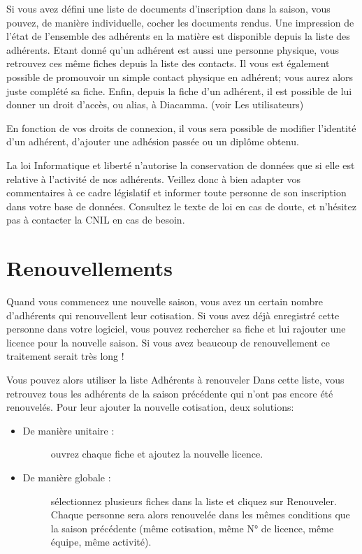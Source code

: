 \documentclass[a4paper,10pt,oneside,french]{sphinxmanual}
\begin{document}
Si vous avez défini une liste de documents d’inscription dans la saison, vous pouvez, de manière individuelle, cocher les documents rendus. Une impression de l’état de l’ensemble des adhérents en la matière est disponible depuis la liste des adhérents.
Etant donné qu’un adhérent est aussi une personne physique, vous retrouvez ces même fiches depuis la liste des contacts. Il vous est également possible de promouvoir un simple contact physique en adhérent; vous aurez alors juste complété sa fiche.
Enfin, depuis la fiche d’un adhérent, il est possible de lui donner un droit d’accès, ou alias, à Diacamma. (voir Les utilisateurs)

En fonction de vos droits de connexion, il vous sera possible de modifier l’identité d’un adhérent, d’ajouter une adhésion passée ou un diplôme obtenu.

\noindent{}

 La loi Informatique et liberté n’autorise la conservation de données que si elle est relative à l’activité de nos adhérents. Veillez donc à bien adapter vos commentaires à ce cadre législatif et informer toute personne de son inscription dans votre base de données.
Consultez le texte de loi en cas de doute, et n’hésitez pas à contacter la CNIL en cas de besoin.


\section{Renouvellements}
\label{\detokenize{member/renew::doc}}\label{\detokenize{member/renew:renouvellements}}
Quand vous commencez une nouvelle saison, vous avez un certain nombre d’adhérents qui renouvellent leur cotisation. Si vous avez déjà enregistré cette personne dans votre logiciel, vous pouvez rechercher sa fiche et lui rajouter une licence pour la nouvelle saison.
Si vous avez beaucoup de renouvellement ce traitement serait très long !

Vous pouvez alors utiliser la liste Adhérents à renouveler
Dans cette liste, vous retrouvez tous les adhérents de la saison précédente qui n’ont pas encore été renouvelés.
Pour leur ajouter la nouvelle cotisation, deux solutions:
\begin{itemize}
\item {} \begin{description}
\item[{De manière unitaire :}] \leavevmode
ouvrez chaque fiche et ajoutez la nouvelle licence.

\end{description}

\item {} \begin{description}
\item[{De manière globale :}] \leavevmode
sélectionnez plusieurs fiches dans la liste et cliquez sur Renouveler. Chaque personne sera alors renouvelée dans les mêmes conditions que la saison précédente (même cotisation, même N° de licence, même équipe, même activité).

\end{description}

\end{itemize}
\end{document}
